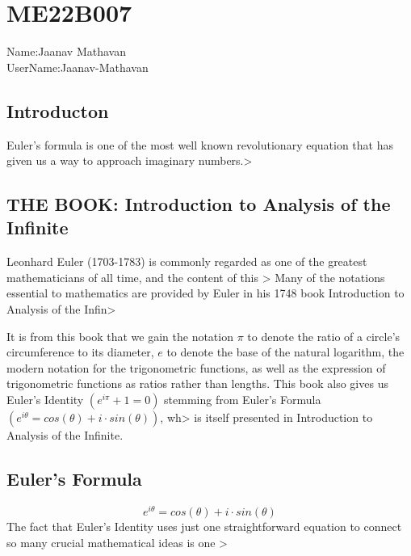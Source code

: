 \section{ME22B007}
Name:Jaanav Mathavan\\
UserName:Jaanav-Mathavan\\
\subsection{Introducton}
Euler's formula is one of the most well known revolutionary equation that has given us a way to approach imaginary numbers.>
\subsection{THE BOOK: Introduction to Analysis of the Infinite}
Leonhard Euler (1703-1783) is commonly regarded as one of the greatest mathematicians of all time, and the content of this >
Many of the notations essential to mathematics are provided by Euler in his 1748 book Introduction to Analysis of the Infin>

It is from this book that we gain the
notation $\pi$ to denote the ratio of a circle’s circumference to its diameter, $e$ to denote the base
of the natural logarithm, the modern notation for the trigonometric functions, as well as the
expression of trigonometric functions as ratios rather than lengths. This book also gives us
Euler’s Identity $(e^{i\pi} + 1 = 0)$ stemming from Euler’s Formula $(e^{i\theta} = cos(\theta) + i \cdot sin(\theta))$, wh>
is itself presented in Introduction to Analysis of the Infinite.

\subsection{Euler's Formula}
$$e^{i \theta}=cos(\theta)+i \cdot sin(\theta)$$
The fact that Euler's Identity uses just one straightforward equation to connect so many crucial mathematical ideas is one >
